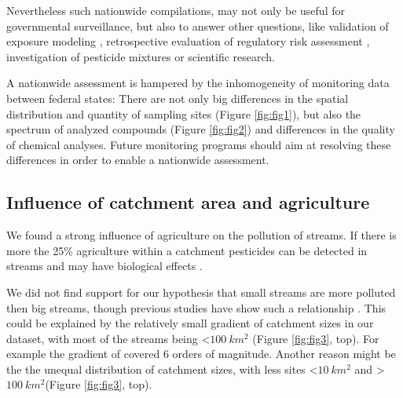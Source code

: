 \documentclass[journal=esthag,manuscript=article]{achemso}
\begin{document}
Nevertheless such nationwide compilations, may not only be useful for governmental surveillance, but also to answer other questions, like validation of exposure modeling , retrospective evaluation of regulatory risk assessment \citep{knauer_pesticides_2016,stehle_pesticide_2015}, investigation of pesticide mixtures  or scientific research.

A nationwide assessment is hampered  by the inhomogeneity of monitoring data between federal states:
There are not only big differences in the spatial distribution and quantity of sampling sites (Figure \ref{fig:fig1}), but also the spectrum of analyzed compounds (Figure \ref{fig:fig2}) and differences in the quality of chemical analyses.
Future monitoring programs should aim at resolving these differences in order to enable a nationwide assessment. 



\subsection{Influence of catchment area and agriculture}
We found a strong influence of agriculture on the pollution of streams.
If there is more the 25\% agriculture within a catchment pesticides can be detected in streams and may have biological effects .

We did not find support for our hypothesis that small streams are more polluted then big streams, though previous studies have show such a relationship \citep{schulz_field_2004,stehle_pesticide_2015}.
This could be explained by the relatively small gradient of catchment sizes in our dataset, with most of the streams being \textless $100~km^2$ (Figure \ref{fig:fig3}, top).
For example the gradient of \citet{schulz_field_2004} covered 6 orders of magnitude.
Another reason might be the the unequal distribution of catchment sizes, with less sites \textless $10~km^2$ and \textgreater $100~km^2$(Figure \ref{fig:fig3}, top).









\end{document}
